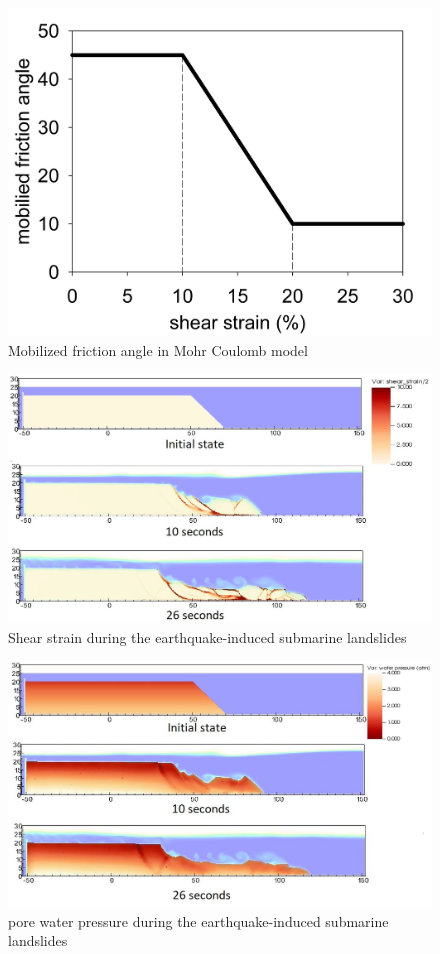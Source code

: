 \documentclass[preprint,12pt]{elsarticle}
\begin{document}
%
%
\begin{figure}[h]
\center
\includegraphics[scale=0.3]{model.jpg}
\caption{Mobilized friction angle in Mohr Coulomb model}
\label{fig:model}
\end{figure}
%
%

%
%
\begin{figure}[h]
\center
\includegraphics[scale=0.5]{landslide_gamma.jpeg}
\caption{Shear strain during the earthquake-induced submarine landslides}
\label{fig:gamma}
\end{figure}
%
%

%
%
\begin{figure}[h]
\center
\includegraphics[scale=0.5]{PWP.jpeg}
\caption{pore water pressure during the earthquake-induced submarine landslides}
\label{fig:PWP}
\end{figure}
%
%
\end{document}
